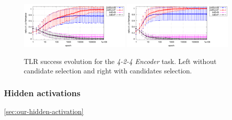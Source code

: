 \begin{figure}[H]
  \centering
  \includegraphics[width=0.48\textwidth]{img/tlr-auto4-best-perf.pdf}   
  \includegraphics[width=0.48\textwidth]{img/tlr-auto4-best-can.pdf}      
  \caption{TLR success evolution for the \emph{4-2-4 Encoder} task. Left without candidate selection and right with candidates selection. } %
  \label{fig:results-tlr-auto4-epoch} 
\end{figure}


\subsubsection{Hidden activations}
\ref{sec:our-hidden-activation}  


